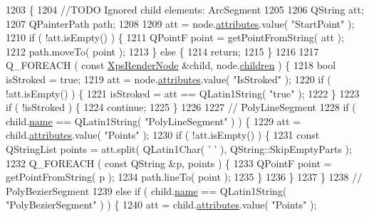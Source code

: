 \begin{DoxyCode}
1203 \{
1204     \textcolor{comment}{//TODO Ignored child elements: ArcSegment}
1205 
1206     QString att;
1207     QPainterPath path;
1208 
1209     att = node.\hyperlink{classXpsRenderNode_a7f6fca2e06dd119e7eb20139af6c8477}{attributes}.value( \textcolor{stringliteral}{"StartPoint"} );
1210     \textcolor{keywordflow}{if} ( !att.isEmpty() ) \{
1211         QPointF point = getPointFromString( att );
1212         path.moveTo( point );
1213     \} \textcolor{keywordflow}{else} \{
1214         \textcolor{keywordflow}{return};
1215     \}
1216 
1217     Q\_FOREACH ( \textcolor{keyword}{const} \hyperlink{classXpsRenderNode}{XpsRenderNode} &child, node.\hyperlink{classXpsRenderNode_a8a1cc47feef96fa119b2491e60ebeb09}{children} ) \{
1218         \textcolor{keywordtype}{bool} isStroked = \textcolor{keyword}{true};
1219         att = node.\hyperlink{classXpsRenderNode_a7f6fca2e06dd119e7eb20139af6c8477}{attributes}.value( \textcolor{stringliteral}{"IsStroked"} );
1220         \textcolor{keywordflow}{if} ( !att.isEmpty() ) \{
1221             isStroked = att == QLatin1String( \textcolor{stringliteral}{"true"} );
1222         \}
1223         \textcolor{keywordflow}{if} ( !isStroked ) \{
1224             \textcolor{keywordflow}{continue};
1225         \}
1226 
1227         \textcolor{comment}{// PolyLineSegment}
1228         \textcolor{keywordflow}{if} ( child.\hyperlink{classXpsRenderNode_a7b3d33b9669c0235e095d5efc870ccf0}{name} == QLatin1String( \textcolor{stringliteral}{"PolyLineSegment"} ) ) \{
1229             att = child.\hyperlink{classXpsRenderNode_a7f6fca2e06dd119e7eb20139af6c8477}{attributes}.value( \textcolor{stringliteral}{"Points"} );
1230             \textcolor{keywordflow}{if} ( !att.isEmpty() ) \{
1231                 \textcolor{keyword}{const} QStringList points = att.split( QLatin1Char( \textcolor{charliteral}{' '} ), QString::SkipEmptyParts );
1232                 Q\_FOREACH ( \textcolor{keyword}{const} QString &p, points ) \{
1233                     QPointF point = getPointFromString( p );
1234                     path.lineTo( point );
1235                 \}
1236             \}
1237         \}
1238         \textcolor{comment}{// PolyBezierSegment}
1239         \textcolor{keywordflow}{else} \textcolor{keywordflow}{if} ( child.\hyperlink{classXpsRenderNode_a7b3d33b9669c0235e095d5efc870ccf0}{name} == QLatin1String( \textcolor{stringliteral}{"PolyBezierSegment"} ) ) \{
1240             att = child.\hyperlink{classXpsRenderNode_a7f6fca2e06dd119e7eb20139af6c8477}{attributes}.value( \textcolor{stringliteral}{"Points"} );

\end{DoxyCode}
